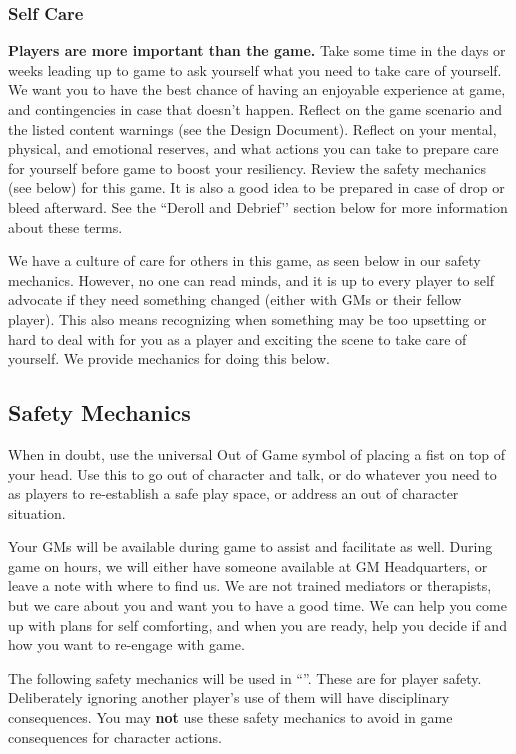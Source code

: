 \documentclass[sheet]{GL2020}
\begin{document}
\subsubsection{Self Care}
\textbf{Players are more important than the game.} Take some time in the days or weeks leading up to game to ask yourself what you need to take care of yourself. We want you to have the best chance of having an enjoyable experience at game, and contingencies in case that doesn't happen. Reflect on the game scenario and the listed content warnings (see the Design Document). Reflect on your mental, physical, and emotional reserves, and what actions you can take to prepare care for yourself before game to boost your resiliency. Review the safety mechanics (see below) for this game. It is also a good idea to be prepared in case of drop or bleed afterward. See the ``Deroll and Debrief'’ section below for more information about these terms.

We have a culture of care for others in this game, as seen below in our safety mechanics. However, no one can read minds, and it is up to every player to self advocate if they need something changed (either with GMs or their fellow player). This also means recognizing when something may be too upsetting or hard to deal with for you as a player and exciting the scene to take care of yourself. We provide mechanics for doing this below. 

\subsection{Safety Mechanics}
When in doubt, use the universal Out of Game symbol of placing a fist on top of your head. Use this to go out of character and talk, or do whatever you need to as players to re-establish a safe play space, or address an out of character situation. 

Your GMs will be available during game to assist and facilitate as well. During game on hours, we will either have someone available at GM Headquarters, or leave a note with where to find us. We are not trained mediators or therapists, but we care about you and want you to have a good time. We can help you come up with plans for self comforting, and when you are ready, help you decide if and how you want to re-engage with game.

The following safety mechanics will be used in ``\gamename{}''. These are for player safety. Deliberately ignoring another player's use of them will have disciplinary consequences. You may \textbf{not} use these safety mechanics to avoid in game consequences for character actions.
\end{document}
